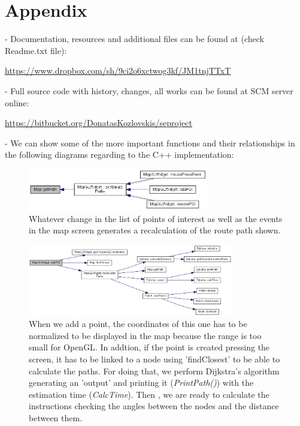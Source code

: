 \documentclass{article}
\begin{document}
\clearpage
\section{Appendix}

- Documentation, resources and additional files can be found at (check Readme.txt file): 

\url{https://www.dropbox.com/sh/9ci2o6xctwog3kf/JM1tnjTTxT}

- Full source code with history, changes, all works can be found at SCM server online:

\url{https://bitbucket.org/DonatasKozlovskis/seproject} 

- We can show some of the more important functions and their relationships in the following diagrams regarding to the C++ implementation:

\begin{figure}[h]
\centering
\includegraphics[width=0.7\textwidth]{2.png}
\caption{Whatever change in the list of points of interest as well as the events in the map screen generates a recalculation of the route path shown.}
\end{figure}

\begin{figure}[h]
\centering
\includegraphics[width=0.8\textwidth]{4.png}
\caption{When we add a point, the coordinates of this one has to be normalized to be displayed in the map because the range is too small for OpenGL. In addtion, if the point is created pressing the screen, it has to be linked to a node using 'findClosest' to be able to calculate the paths. For doing that, we perform Dijkstra's algorithm generating an 'output' and printing it (\textit{PrintPath()}) with the estimation time (\textit{CalcTime}). Then , we are ready to calculate the instructions checking the angles between the nodes and the distance between them.}
\end{figure}
\end{document}
